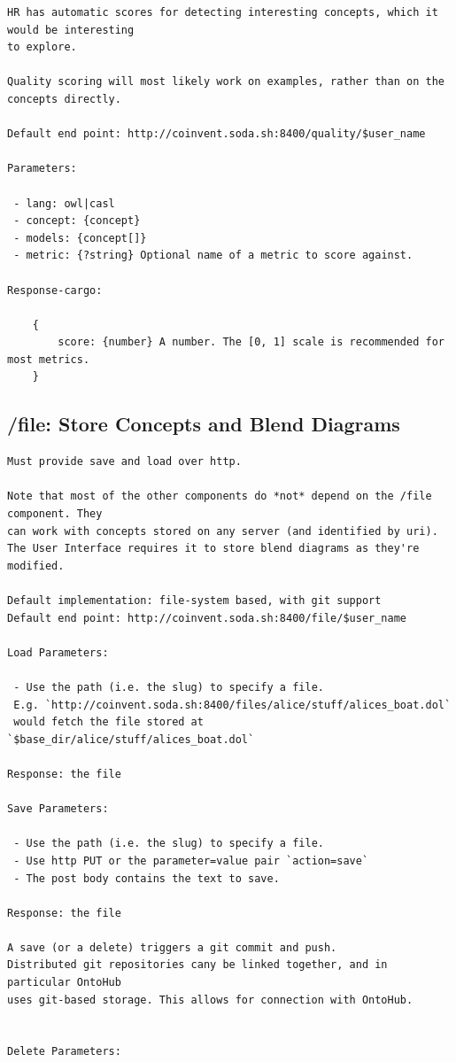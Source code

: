 \documentclass[10pt]{article}
\begin{document}
\begin{appendices}
\begin{verbatim}
HR has automatic scores for detecting interesting concepts, which it would be interesting
to explore.

Quality scoring will most likely work on examples, rather than on the concepts directly.
 
Default end point: http://coinvent.soda.sh:8400/quality/$user_name

Parameters:

 - lang: owl|casl
 - concept: {concept}
 - models: {concept[]} 
 - metric: {?string} Optional name of a metric to score against.

Response-cargo: 
	
	{
		score: {number} A number. The [0, 1] scale is recommended for most metrics.
	}
\end{verbatim}

\subsection{/file: Store Concepts and Blend Diagrams}
\begin{verbatim}
Must provide save and load over http.

Note that most of the other components do *not* depend on the /file component. They
can work with concepts stored on any server (and identified by uri). The User Interface requires it to store blend diagrams as they're modified.

Default implementation: file-system based, with git support   
Default end point: http://coinvent.soda.sh:8400/file/$user_name

Load Parameters: 

 - Use the path (i.e. the slug) to specify a file.   
 E.g. `http://coinvent.soda.sh:8400/files/alice/stuff/alices_boat.dol`
 would fetch the file stored at `$base_dir/alice/stuff/alices_boat.dol`

Response: the file  
  
Save Parameters:

 - Use the path (i.e. the slug) to specify a file.
 - Use http PUT or the parameter=value pair `action=save`
 - The post body contains the text to save.

Response: the file  

A save (or a delete) triggers a git commit and push. 
Distributed git repositories cany be linked together, and in particular OntoHub
uses git-based storage. This allows for connection with OntoHub.

 
Delete Parameters:


\end{verbatim}
\end{appendices}
\end{document}
